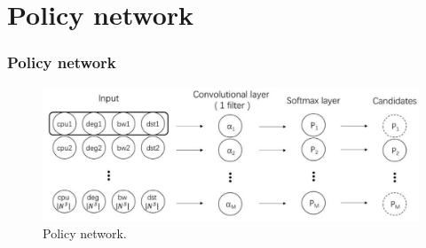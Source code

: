 \documentclass{beamer}
\begin{document}
\section{Policy network}
\begin{frame}
	\frametitle{Policy network}
	\begin{figure}
		\centering
		\includegraphics[width=0.9\linewidth]{../Images/policyNetwork}
		\caption{Policy network.}
		\label{fig:policynetwork}
	\end{figure}
\end{frame}
\end{document}
